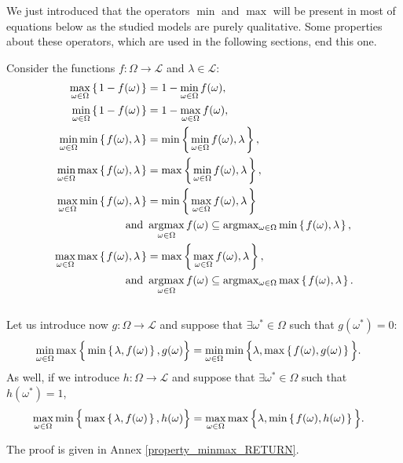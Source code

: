 We just introduced that
the operators $\min$ and $\max$
will be present in most of equations below
as the studied models are purely qualitative.
Some properties about these operators,
which are used in the following sections, 
end this one.
\newpage
\begin{Property}
\label{property_minmax}
Consider the functions $f: \Omega \rightarrow \mathcal{L}$ and $\lambda \in \mathcal{L}$:
\begin{align}
\label{equationmaxmin1} \max_{\omega \in \Omega} \left\{ \left.  1 - f(\omega)  \right. \right\} &= 1 - \min_{\omega \in \Omega} f(\omega), \\
\label{equationmaxmin2} \min_{\omega \in \Omega} \left\{ \left.  1 - f(\omega)  \right. \right\} &= 1 - \max_{\omega \in \Omega} f(\omega), \\
\label{equationmaxmin5} \min_{\omega \in \Omega} \min \left\{ \left.  f(\omega), \lambda  \right. \right\} &= \min \left\{ \left.  \min_{\omega \in \Omega} f(\omega), \lambda  \right. \right\}, \\
\label{equationmaxmin4} \min_{\omega \in \Omega} \max \left\{ \left.  f(\omega), \lambda  \right. \right\} &= \max \left\{ \left.  \min_{\omega \in \Omega} f(\omega), \lambda  \right. \right\}, \\
\label{equationmaxmin3} \max_{\omega \in \Omega} \min \left\{ \left.  f(\omega), \lambda  \right. \right\} &= \min \left\{ \left.  \max_{\omega \in \Omega} f(\omega), \lambda  \right. \right\} \\
\label{equationargmax1} \mbox{ and } & \operatorname*{argmax}_{\omega \in \Omega} f(\omega) \subseteq \operatorname*{argmax_{\omega \in \Omega}} \min \left\{ \left.  f(\omega), \lambda  \right. \right\},\\
\label{equationmaxmin6} \max_{\omega \in \Omega} \max \left\{ \left.  f(\omega), \lambda  \right. \right\} &= \max \left\{ \left.  \max_{\omega \in \Omega} f(\omega), \lambda  \right. \right\},\\
\label{equationargmax2} \mbox{ and } & \operatorname*{argmax}_{\omega \in \Omega} f(\omega) \subseteq \operatorname*{argmax_{\omega \in \Omega}} \max \left\{ \left.  f(\omega), \lambda  \right. \right\}. 
\end{align}
\\
Let us introduce now $g:\Omega \rightarrow \mathcal{L}$ and suppose that $\exists \omega^* \in \Omega$
such that $g(\omega^*)=0$:
\begin{align}
\label{equationmaxmin7} \min_{\omega \in \Omega} \max \Big\{ \min \left\{ \left.  \lambda, f(\omega)  \right. \right\}, g(\omega) \Big\} &= \min_{\omega \in \Omega} \min \Big\{ \lambda, \max \left\{ \left.  f(\omega), g(\omega) \right. \right\} \Big\}.
\end{align}
As well, if we introduce $h:\Omega \rightarrow \mathcal{L}$ and 
suppose that $\exists \omega^* \in \Omega$
such that $h(\omega^*)=1$,
\begin{align}
\label{equationmaxmin8} \max_{\omega \in \Omega} \min \Big\{ \max \left\{ \left.  \lambda, f(\omega)  \right. \right\}, h(\omega) \Big\} &= \max_{\omega \in \Omega} \max \Big\{ \lambda, \min \left\{ \left.  f(\omega), h(\omega) \right. \right\} \Big\}.
\end{align}
\end{Property}
The proof is given in Annex \ref{property_minmax_RETURN}.

